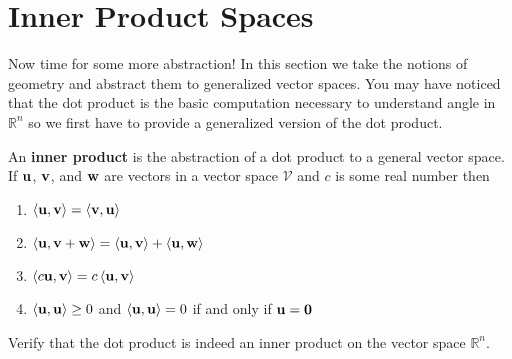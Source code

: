 \section{Inner Product Spaces}
Now time for some more abstraction!  In this section we take the notions of geometry and
abstract them to generalized vector spaces.  You may have noticed that the dot product is
the basic computation necessary to understand angle in $\mathbb{R}^n$ so we first have to
provide a generalized version of the dot product.

\begin{definition}
    An {\bf inner product} is the abstraction of a dot product to a general vector space.
    If ${\bf u}$, ${\bf v}$, and ${\bf w}$ are vectors in a vector space $\mathcal{V}$ and $c$ is some real
    number then
        \begin{enumerate}
            \item $\left< {\bf u},{\bf v}\right> = \left<{\bf v},{\bf u}\right>$
            \item $\left< {\bf u},{\bf v} + {\bf w}\right> = \left< {\bf u},{\bf v}\right> + \left<
                {\bf u},{\bf w}\right>$
            \item $\left< c{\bf u},{\bf v}\right> = c \left< {\bf u},{\bf v}\right>$
            \item $\left< {\bf u},{\bf u}\right> \ge 0$ and $\left<{\bf u},{\bf u}\right>=0$ if and only if
                ${\bf u}={\bf 0}$
        \end{enumerate}
\end{definition}

\begin{problem}
    Verify that the dot product is indeed an inner product on the vector space
    $\mathbb{R}^n$. 
\end{problem}

